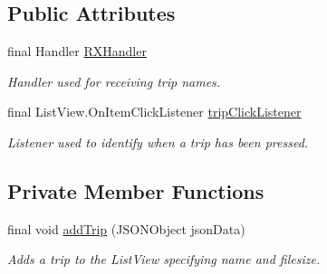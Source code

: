 \subsection*{Public Attributes}
\begin{DoxyCompactItemize}
\item 
final Handler \hyperlink{classcom_1_1jack_1_1motorbikestatistics_1_1_load_device_fragment_a7c26c8686c290d8766b051f31473d716}{R\+X\+Handler}
\begin{DoxyCompactList}\small\item\em Handler used for receiving trip names. \end{DoxyCompactList}\item 
final List\+View.\+On\+Item\+Click\+Listener \hyperlink{classcom_1_1jack_1_1motorbikestatistics_1_1_load_device_fragment_a06ac1ecf82b1709e25421b1b77eb768c}{trip\+Click\+Listener}
\begin{DoxyCompactList}\small\item\em Listener used to identify when a trip has been pressed. \end{DoxyCompactList}\end{DoxyCompactItemize}
\subsection*{Private Member Functions}
\begin{DoxyCompactItemize}
\item 
final void \hyperlink{classcom_1_1jack_1_1motorbikestatistics_1_1_load_device_fragment_a23957dbe1518052c7167d86938a14c35}{add\+Trip} (J\+S\+O\+N\+Object json\+Data)
\begin{DoxyCompactList}\small\item\em Adds a trip to the List\+View specifying name and filesize. \end{DoxyCompactList}\end{DoxyCompactItemize}
